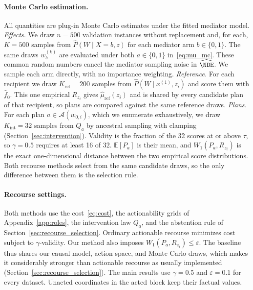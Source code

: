 \paragraph{Monte Carlo estimation.}
All quantities are plug-in Monte Carlo estimates under the fitted mediator
model.
\emph{Effects.} We draw $n=500$ validation instances without replacement
and, for each, $K=500$ samples from $\hat P(W\mid X=b,z)$ for each mediator
arm $b\in\{0,1\}$. The same draws $w^{(k)}_b$ are evaluated under both
$a\in\{0,1\}$ in~\eqref{eq:mu_mc}. These common random numbers cancel the
mediator sampling noise in $\widehat\NDE$. We sample each arm directly, with no
importance weighting.
\emph{Reference.} For each recipient we draw $K_{\mathrm{ref}}=200$ samples
from $\hat P(W\mid x^{(1)},z_i)$ and score them with $\hat f_0$. This one
empirical $R_{z_i}$ gives $\hat\mu_{\mathrm{ref}}(z_i)$ and is
shared by every candidate plan of that recipient, so plans are compared
against the same reference draws.
\emph{Plans.} For each plan $a\in\mathcal A(w_{0,i})$, which we enumerate
exhaustively, we draw $K_{\mathrm{int}}=32$ samples from $Q_a$ by ancestral
sampling with clamping (Section~\ref{sec:intervention}). Validity is the
fraction of the 32 scores at or above $\tau$, so $\gamma=0.5$ requires at
least 16 of 32. $\mathbb E[P_a]$ is their mean, and $W_1(P_a,R_{z_i})$ is the
exact one-dimensional distance between the two empirical score distributions.
Both recourse methods select from the same candidate draws, so the only
difference between them is the selection rule.

\paragraph{Recourse settings.}
Both methods use the cost~\eqref{eq:cost}, the actionability grids of
Appendix~\ref{app:roles}, the intervention law $Q_a$, and the abstention
rule of Section~\ref{sec:recourse_selection}. Ordinary actionable recourse
minimizes cost subject to $\gamma$-validity. Our method also imposes
$W_1(P_a,R_{z_i})\le\varepsilon$. The baseline thus shares our causal model,
action space, and Monte Carlo draws, which makes it considerably stronger
than actionable recourse as usually implemented
(Section~\ref{sec:recourse_selection}). The main results use $\gamma=0.5$ and
$\varepsilon=0.1$ for every dataset. Unacted coordinates in the acted block
keep their factual values.

